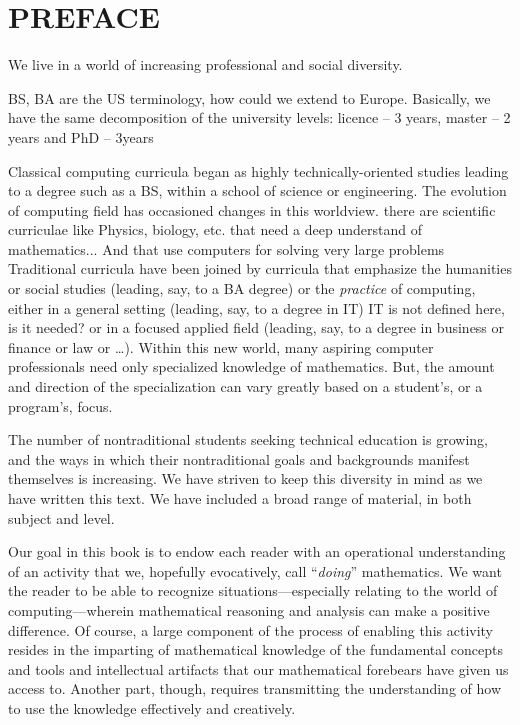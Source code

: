 
\chapter*{PREFACE}

We live in a world of increasing professional and social diversity.

\medskip

{\Denis BS, BA are the US terminology, how could we extend to Europe.
Basically, we have the same decomposition of the university levels:
licence -- 3 years, master -- 2 years and PhD -- 3years}

Classical computing curricula began as highly technically-oriented
studies leading to a degree such as a BS, within a school of science
or engineering.  The evolution of computing field has occasioned
changes in this worldview.  
{\Denis there are scientific curriculae like Physics, biology, etc. that need 
a deep understand of mathematics... And that use computers for solving very large problems}
Traditional curricula have been joined by
curricula that emphasize the humanities or social studies (leading,
say, to a BA degree) or the {\em practice} of computing, either in a
general setting (leading, say, to a degree in IT) 
{\Denis IT is not defined here, is it needed?}
or in a focused
applied field (leading, say, to a degree in business or finance or law
or \ldots).  Within this new world, many aspiring computer
professionals need only specialized knowledge of mathematics.  But,
the amount and direction of the specialization can vary greatly based
on a student's, or a program's, focus.

\medskip

The number of nontraditional students seeking technical education is
growing, and the ways in which their nontraditional goals and
backgrounds manifest themselves is increasing.  We have striven to
keep this diversity in mind as we have written this text.  We have
included a broad range of material, in both subject and level.

\bigskip

Our goal in this book is to endow each reader with an operational
understanding of an activity that we, hopefully evocatively, call
``{\em doing}'' mathematics.  We want the reader to be able to
recognize situations---especially relating to the world of
computing---wherein mathematical reasoning and analysis can make a
positive difference.  Of course, a large component of the process of
enabling this activity resides in the imparting of mathematical
knowledge of the fundamental concepts and tools and intellectual
artifacts that our mathematical forebears have given us access to.
Another part, though, requires transmitting the understanding of how
to use the knowledge effectively and creatively.


